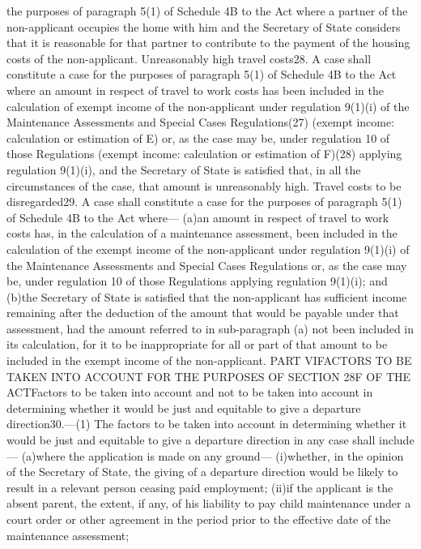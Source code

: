 \documentclass[a4paper]{article}
\begin{document}
the purposes of paragraph 5(1) of Schedule 4B to the Act where a partner of the
non-applicant occupies the home with him and the Secretary of State considers
that it is reasonable for that partner to contribute to the payment of the
housing costs of the non-applicant.
Unreasonably high travel costs28. A case shall constitute a case for the
purposes of paragraph 5(1) of Schedule 4B to the Act where an amount in respect
of travel to work costs has been included in the calculation of exempt income of
the non-applicant under regulation 9(1)(i) of the Maintenance Assessments and
Special Cases Regulations(27) (exempt income: calculation or estimation of E)
or, as the case may be, under regulation 10 of those Regulations (exempt income:
calculation or estimation of F)(28) applying regulation 9(1)(i), and the
Secretary of State is satisfied that, in all the circumstances of the case, that
amount is unreasonably high.
Travel costs to be disregarded29. A case shall constitute a case for the
purposes of paragraph 5(1) of Schedule 4B to the Act where—
(a)an amount in respect of travel to work costs has, in the calculation of a
maintenance assessment, been included in the calculation of the exempt income of
the non-applicant under regulation 9(1)(i) of the Maintenance Assessments and
Special Cases Regulations or, as the case may be, under regulation 10 of those
Regulations applying regulation 9(1)(i); and
(b)the Secretary of State is satisfied that the non-applicant has sufficient
income remaining after the deduction of the amount that would be payable under
that assessment, had the amount referred to in sub-paragraph (a) not been
included in its calculation, for it to be inappropriate for all or part of that
amount to be included in the exempt income of the non-applicant.
PART VIFACTORS TO BE TAKEN INTO ACCOUNT FOR THE PURPOSES OF SECTION 28F OF THE
ACTFactors to be taken into account and not to be taken into account in
determining whether it would be just and equitable to give a departure
direction30.—(1) The factors to be taken into account in determining whether it
would be just and equitable to give a departure direction in any case shall
include—
(a)where the application is made on any ground—
(i)whether, in the opinion of the Secretary of State, the giving of a departure
direction would be likely to result in a relevant person ceasing paid
employment;
(ii)if the applicant is the absent parent, the extent, if any, of his liability
to pay child maintenance under a court order or other agreement in the period
prior to the effective date of the maintenance assessment;
\end{document}
